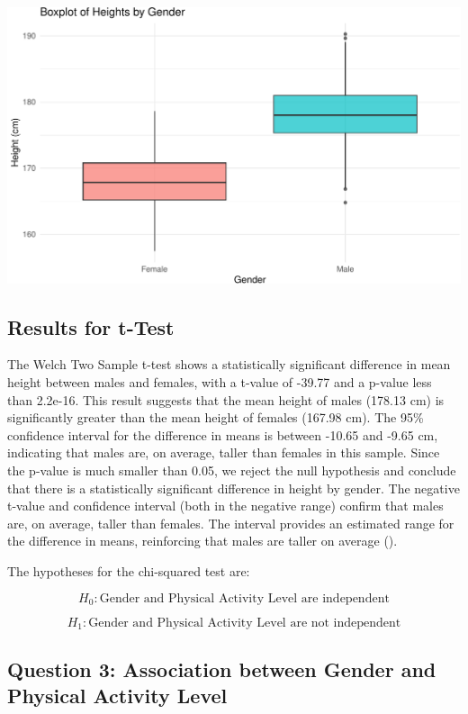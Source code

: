 \documentclass[
]{article}
\begin{document}
\includegraphics{PART-1_files/figure-latex/height-boxplot-density-1.pdf}

\subsection{Results for t-Test}\label{results-for-t-test}

The Welch Two Sample t-test shows a statistically significant difference
in mean height between males and females, with a t-value of -39.77 and a
p-value less than 2.2e-16. This result suggests that the mean height of
males (178.13 cm) is significantly greater than the mean height of
females (167.98 cm). The 95\% confidence interval for the difference in
means is between -10.65 and -9.65 cm, indicating that males are, on
average, taller than females in this sample. Since the p-value is much
smaller than 0.05, we reject the null hypothesis and conclude that there
is a statistically significant difference in height by gender. The
negative t-value and confidence interval (both in the negative range)
confirm that males are, on average, taller than females. The interval
provides an estimated range for the difference in means, reinforcing
that males are taller on average ().

The hypotheses for the chi-squared test are:

\[
H_0: \text{Gender and Physical Activity Level are independent}
\]

\[
H_1: \text{Gender and Physical Activity Level are not independent}
\]

\subsection{Question 3: Association between Gender and Physical Activity
Level}\label{question-3-association-between-gender-and-physical-activity-level}
\end{document}
